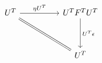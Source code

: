 \[\begin{tikzcd}
	{U^{T}} && {U^{T}F^{T}U^{T}} \\
	\\
	&& {U^{T}}
	\arrow["{\eta U^{T}}", from=1-1, to=1-3]
	\arrow["{U^{T}\epsilon}", from=1-3, to=3-3]
	\arrow[Rightarrow, no head, from=1-1, to=3-3]
\end{tikzcd}\]